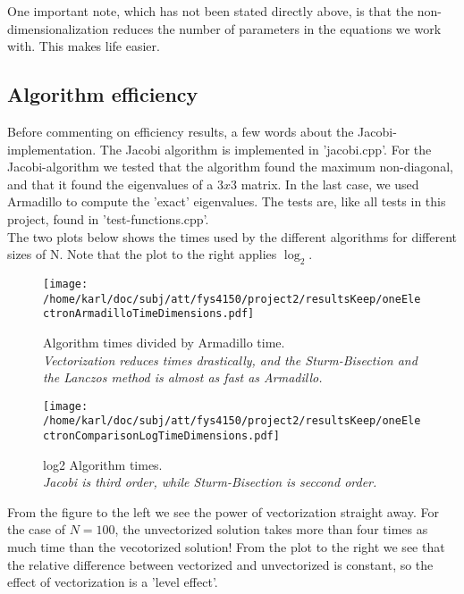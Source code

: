 \documentclass{article}
\begin{document}
One important note, which has not been stated directly above, is that the non-dimensionalization reduces the number of parameters in the equations we work with. This makes life easier.

\subsection{Algorithm efficiency}
Before commenting on efficiency results, a few words about the Jacobi-implementation. The Jacobi algorithm is implemented in 'jacobi.cpp'. For the Jacobi-algorithm we tested that the algorithm found the maximum non-diagonal, and that it found the eigenvalues of a $3 x 3$ matrix. In the last case, we used Armadillo to compute the 'exact' eigenvalues. The tests are, like all tests in this project, found in 'test-functions.cpp'.\\

The two plots below shows the times used by the different algorithms for different sizes of N. Note that the plot to the right applies $\log_2$.

\begin{minipage}{.49\textwidth} %
	\begin{figure}[H]
		\centering
		\texttt{[image: /home/karl/doc/subj/att/fys4150/project2/resultsKeep/oneElectronArmadilloTimeDimensions.pdf]}
		\caption{Algorithm times divided by Armadillo time.\\ \textit{Vectorization reduces times drastically, and the Sturm-Bisection and the Lanczos  method is almost as fast as Armadillo.}}
		\label{1}
	\end{figure}
\end{minipage}\hfill
\vspace{2ex}
\begin{minipage}{.49\textwidth}
	\begin{figure}[H]
		\centering
		\texttt{[image: /home/karl/doc/subj/att/fys4150/project2/resultsKeep/oneElectronComparisonLogTimeDimensions.pdf]}
		\caption{log2 Algorithm times.\\ \textit{Jacobi is third order, while Sturm-Bisection is seccond order.}}
		\label{1}
	\end{figure}
\end{minipage}\hfill
\vspace{2ex}

From the figure to the left we see the power of vectorization straight away. For the case of $N = 100$, the unvectorized solution takes more than four times as much time than the vecotorized solution! From the plot to the right we see that the relative difference between vectorized and unvectorized is constant, so the effect of vectorization is a 'level effect'. \\
\end{document}
